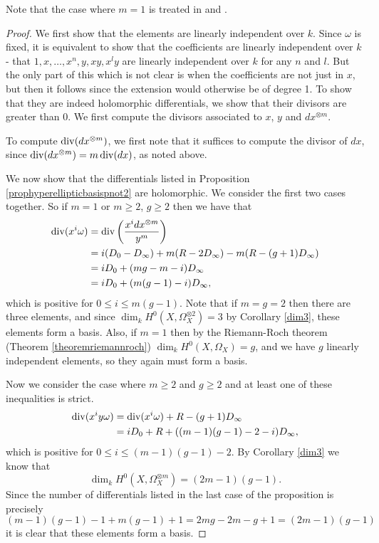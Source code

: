     \begin{rem}
    Note that the case where $m=1$ is treated in \cite[Prop. 7.4.26]{liu} and \cite[Ch. IV, \S 4, Prop. 4.3]{griffiths}.
    \end{rem}
    
    \begin{proof}
    We first show that the elements are linearly independent over $k$.
    Since $\omega$ is fixed, it is equivalent to show that the coefficients are linearly independent over $k$ - \ie that $1,x,\ldots ,x^n, y, xy, x^ly$ are linearly independent over $k$ for any $n$ and $l$.
    But the only part of this which is not clear is when the coefficients are not just in $x$, but then it follows since the extension would otherwise be of degree 1.
    To show that they are indeed holomorphic differentials, we show that their divisors are greater than $0$.
    We first compute the divisors associated to $x$, $y$ and $dx^{\otimes m}$.
    
    To compute $\operatorname{div} (dx^{\otimes m})$, we first note that it suffices to compute the divisor of $dx$, since $\operatorname{div} (dx^{\otimes m}) =m\operatorname{div} (dx)$, as noted above.
    
    
    We now show that the differentials listed in Proposition \ref{prophyperellipticbasispnot2} are holomorphic.
    We consider the first two cases together.
    So if $m=1$ or $m\geq 2$, $g\geq 2$ then we have that
        \begin{align*}
        \operatorname{div}(x^i\omega) & =  \operatorname{div} \left( \frac{x^idx^{\otimes m}}{y^m} \right)\\ 
        & =  i(D_0 -D_\infty) + m(R-2D_\infty) -m(R-(g+1)D_\infty) \\
        & =  iD_0 + (mg -m -i)D_\infty \\
        & =  iD_0 + (m(g-1) -i)D_\infty,
        \end{align*}
    which is positive for $0\leq i \leq m(g-1)$.
    Note that if $m=g=2$ then there are three elements, and since $\dim_kH^0(X,\Omega_X^{\otimes 2})=3$ by Corollary \ref{dim3}, these elements form a basis.
    Also, if $m=1$ then by the Riemann-Roch theorem (Theorem \ref{theoremriemannroch}) $\dim_k H^0(X,\Omega_X)=g$, and we have $g$ linearly independent elements, so they again must form a basis.
    
    
    
    Now we consider the case where $m\geq 2$ and $g \geq 2$ and at least one of these inequalities is strict.
        \begin{align*}
        \operatorname{div} (x^iy\omega) & =  \operatorname{div}(x^i\omega) + R -(g+1)D_\infty \\
        & =  iD_0 + R +((m-1)(g-1)-2-i)D_\infty,
        \end{align*}
    which is positive for $0\leq i \leq (m-1)(g-1)-2$.
    By Corollary \ref{dim3} we know that 
        \[
        \dim_kH^0(X,\Omega_X^{\otimes m}) = (2m-1)(g-1).
        \]
    Since the number of differentials listed in the last case of the proposition is precisely
        \[
        (m-1)(g-1)-1 + m(g-1) +1 = 2mg -2m -g + 1 = (2m-1)(g-1)
        \]
    it is clear that these elements form a basis.
    \end{proof}


